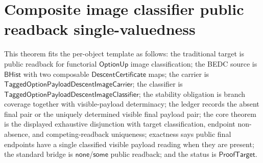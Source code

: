 \section{Composite image classifier public readback single-valuedness}
\label{sec:option-composite-image-classifier-public-readback-single-valued}

\begin{theorem}
\label{thm:tagged-option-composite-image-classifier-public-readback-single-valuedness}
This theorem fits the per-object template as follows: the traditional target is
public readback for functorial $\mathsf{OptionUp}$ image classification; the
BEDC source is $\mathsf{BHist}$ with two composable
$\mathsf{DescentCertificate}$ maps; the carrier is
$\mathsf{TaggedOptionPayloadDescentImageCarrier}$; the classifier is
$\mathsf{TaggedOptionPayloadDescentImageClassifier}$; the stability obligation
is branch coverage together with visible-payload determinacy; the ledger records
the absent final pair or the uniquely determined visible final payload pair; the
core theorem is the displayed exhaustive disjunction with target classification,
endpoint non-absence, and competing-readback uniqueness; exactness says public
final endpoints have a single classified visible payload reading when they are
present; the standard bridge is $\mathsf{none}$/$\mathsf{some}$ public readback;
and the status is $\mathsf{ProofTarget}$.


\end{theorem}
